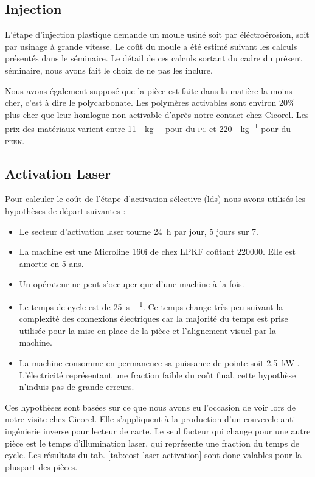 \subsection{Injection}

L'étape d'injection plastique demande un moule usiné soit par éléctroérosion, soit par usinage à grande vitesse.
Le coût du moule a été estimé suivant les calculs présentés dans le séminaire\cite{electroerosion-2013}.
Le détail de ces calculs sortant du cadre du présent séminaire, nous avons fait le choix de ne pas les inclure. 

Nous avons également supposé que la pièce est faite dans la matière la moins cher, c'est à dire le polycarbonate.
Les polymères activables sont environ 20\% plus cher que leur homlogue non activable d'après notre contact chez Cicorel.
Les prix des matériaux varient entre \SI{11}{\chf\per\kilogram} pour du \textsc{pc} et \SI{220}{\chf\per\kilogram} pour du \textsc{peek}.



\subsection{Activation Laser}
Pour calculer le coût de l'étape d'activation sélective (\gls{lds}) nous avons utilisés les hypothèses de départ suivantes :
\begin{itemize}
    \item Le secteur d'activation laser tourne \SI{24}{\hour} par jour, 5 jours sur 7.
    \item La machine est une Microline 160i de chez LPKF coûtant \SI{220000}{\chf}.
        Elle est amortie en 5 ans.
    \item Un opérateur ne peut s'occuper que d'une machine à la fois.
    \item Le temps de cycle est de \SI{25}{\second\per\piece}.
        Ce temps change très peu suivant la complexité des connexions électriques car la majorité du temps est prise utilisée pour la mise en place de la pièce et l'alignement visuel par la machine.
    \item La machine consomme en permanence sa puissance de pointe soit \SI{2.5}{\kilo\watt} \cite{lpkf-microline-series}.
        L'électricité représentant une fraction faible du coût final, cette hypothèse n'induis pas de grande erreurs.
\end{itemize}

Ces hypothèses sont basées sur ce que nous avons eu l'occasion de voir lors de notre visite chez Cicorel.
Elle s'appliquent à la production d'un couvercle anti-ingénierie inverse pour lecteur de carte.
Le seul facteur qui change pour une autre pièce est le temps d'illumination laser, qui représente une fraction du temps de cycle.
Les résultats du tab. \ref{tab:cost-laser-activation} sont donc valables pour la pluspart des pièces.



